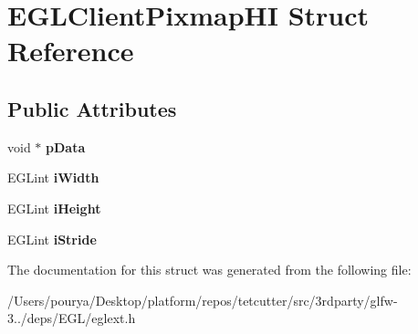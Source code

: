 \hypertarget{structEGLClientPixmapHI}{}\section{E\+G\+L\+Client\+Pixmap\+H\+I Struct Reference}
\label{structEGLClientPixmapHI}
\subsection*{Public Attributes}
\begin{DoxyCompactItemize}
\item 
\hypertarget{structEGLClientPixmapHI_a2c8c1cbd4e5975422f316e4540106eee}{}void $\ast$ {\bfseries p\+Data}\label{structEGLClientPixmapHI_a2c8c1cbd4e5975422f316e4540106eee}

\item 
\hypertarget{structEGLClientPixmapHI_a90346094b9696ba370824167d60d8217}{}E\+G\+Lint {\bfseries i\+Width}\label{structEGLClientPixmapHI_a90346094b9696ba370824167d60d8217}

\item 
\hypertarget{structEGLClientPixmapHI_a963f9b039c1f92713b9849f006a62241}{}E\+G\+Lint {\bfseries i\+Height}\label{structEGLClientPixmapHI_a963f9b039c1f92713b9849f006a62241}

\item 
\hypertarget{structEGLClientPixmapHI_ab89de5b8de06f1886a3d86d8ec6794b2}{}E\+G\+Lint {\bfseries i\+Stride}\label{structEGLClientPixmapHI_ab89de5b8de06f1886a3d86d8ec6794b2}

\end{DoxyCompactItemize}


The documentation for this struct was generated from the following file\+:\begin{DoxyCompactItemize}
\item 
/\+Users/pourya/\+Desktop/platform/repos/tetcutter/src/3rdparty/glfw-\/3../deps/\+E\+G\+L/eglext.\+h\end{DoxyCompactItemize}
